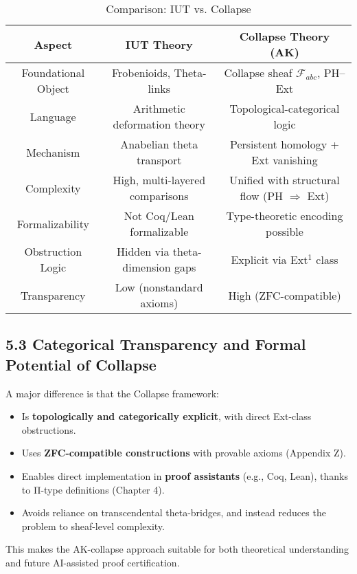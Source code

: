 \documentclass[11pt]{article}
\begin{document}
\begin{table}[h]
\centering
\renewcommand{\arraystretch}{1.4}
\begin{tabular}{|c|c|c|}
\hline
\textbf{Aspect} & \textbf{IUT Theory} & \textbf{Collapse Theory (AK)} \\
\hline
Foundational Object & Frobenioids, Theta-links & Collapse sheaf \( \mathcal{F}_{abc} \), PH–Ext \\
\hline
Language & Arithmetic deformation theory & Topological-categorical logic \\
\hline
Mechanism & Anabelian theta transport & Persistent homology + Ext vanishing \\
\hline
Complexity & High, multi-layered comparisons & Unified with structural flow (PH \(\Rightarrow\) Ext) \\
\hline
Formalizability & Not Coq/Lean formalizable & Type-theoretic encoding possible \\
\hline
Obstruction Logic & Hidden via theta-dimension gaps & Explicit via Ext\( ^1 \) class \\
\hline
Transparency & Low (nonstandard axioms) & High (ZFC-compatible) \\
\hline
\end{tabular}
\caption{Comparison: IUT vs. Collapse}
\end{table}

\subsection{5.3 Categorical Transparency and Formal Potential of Collapse}

A major difference is that the Collapse framework:
\begin{itemize}
    \item Is \textbf{topologically and categorically explicit}, with direct Ext-class obstructions.
    \item Uses \textbf{ZFC-compatible constructions} with provable axioms (Appendix Z).
    \item Enables direct implementation in \textbf{proof assistants} (e.g., Coq, Lean), thanks to Π-type definitions (Chapter 4).
    \item Avoids reliance on transcendental theta-bridges, and instead reduces the problem to sheaf-level complexity.
\end{itemize}

This makes the AK-collapse approach suitable for both theoretical understanding and future AI-assisted proof certification.
\end{document}
